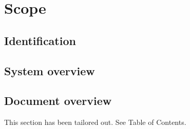 \documentclass[Main]{subfiles}
\begin{document}
\chapter{Scope}

\section{Identification}

\section{System overview}
%


\section{Document overview}
This section has been tailored out. See Table of Contents.
\end{document}
